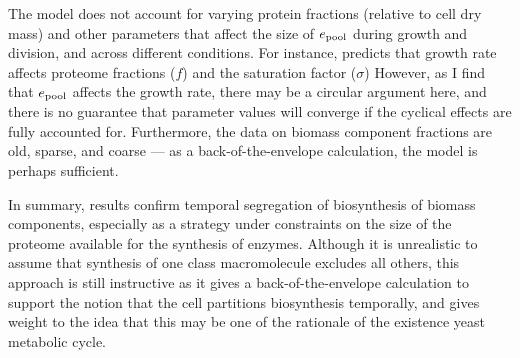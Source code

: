 The model does not account for varying protein fractions (relative to cell dry mass) and other parameters that affect the size of $e_{\mathrm{pool}}$ during growth and division, and across different conditions.
For instance, \parencite{elsemmanWholecellModelingYeast2022} predicts that growth rate affects proteome fractions ($f$) and the saturation factor ($\sigma$)
However, as I find that $e_{\mathrm{pool}}$ affects the growth rate, there may be a circular argument here, and there is no guarantee that parameter values will converge if the cyclical effects are fully accounted for.
Furthermore, the data on biomass component fractions are old, sparse, and coarse --- as a back-of-the-envelope calculation, the model is perhaps sufficient.

In summary, results confirm temporal segregation of biosynthesis of biomass components, especially as a strategy under constraints on the size of the proteome available for the synthesis of enzymes.
Although it is unrealistic to assume that synthesis of one class macromolecule excludes all others, this approach is still instructive as it gives a back-of-the-envelope calculation to support the notion that the cell partitions biosynthesis temporally, and gives weight to the idea that this may be one of the rationale of the existence yeast metabolic cycle.

